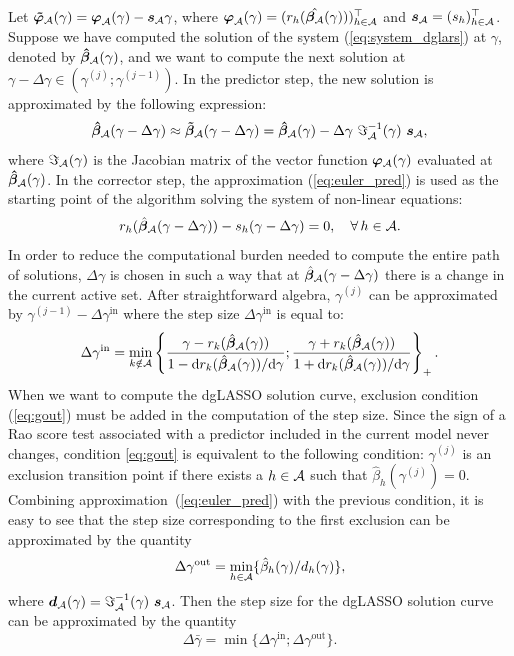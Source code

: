 Let $\boldsymbol{\tilde{\varphi}}_{\mathcal{A}}(\gamma)=\boldsymbol{{\varphi}}_{\mathcal{A}}(\gamma)- \bm{s}_{\mathcal{A}}\gamma$, where $ \boldsymbol{{\varphi}}_{\mathcal{A}}(\gamma) = (r_h(\hat{\bm{\beta}_{\mathcal{A}}}(\gamma)))_{h\in\mathcal{A}}^\top $ and $ \bm{s}_{\mathcal{A}}=(s_h)_{h\in\mathcal{A}}^\top$. Suppose we have computed the solution of the system (\ref{eq:system_dglars}) at $\gamma$, denoted by $\bm{\hat\beta}_{\mathcal{A}}(\gamma)$, and we want to compute the next solution at $\gamma - \Delta\gamma\in(\gamma^{(j)};\gamma^{(j - 1)})$. In the predictor step, the new solution is approximated by the following expression:
%
\begin{equation}\label{eq:euler_pred}
\bm{\hat{\beta}}_{\mathcal{A}}(\gamma - \Delta \gamma) \approx \bm{\tilde{\beta}}_{\mathcal{A}}(\gamma - \Delta \gamma)=\bm{\hat{\beta}}_{\mathcal{A}}(\gamma)- \Delta \gamma \ \Im_{\mathcal{A}}^{-1} (\gamma) \ \bm{s}_{\mathcal{A}},
\end{equation}
%
where $\Im_{\mathcal{A}}(\gamma)$ is the Jacobian matrix of the vector function $\bm{\varphi}_{\mathcal{A}}(\gamma)$ evaluated at  $\bm{\hat{\beta}}_{\mathcal{A}}(\gamma)$. In the corrector step, the approximation (\ref{eq:euler_pred}) is used as the starting point of the algorithm solving the system of non-linear equations:
$$
r_h(\hat{\bm\beta}_{\mathcal{A}}(\gamma-\Delta\gamma)) - s_h (\gamma - \Delta\gamma)  = 0, \quad\forall\,h\in\mathcal{A}.
$$
In order to reduce the computational burden needed to compute the entire path of solutions, $\Delta\gamma$ is chosen in such a way that at $\hat{\bm\beta}_{\mathcal{A}}(\gamma-\Delta\gamma)$ there is a change in the current active set. After straightforward algebra, $\gamma^{(j)}$ can be approximated by $\gamma^{(j - 1)} -\Delta\gamma^{\text{in}}$ where the step size $\Delta\gamma^{\text{in}}$ is equal to:
\begin{equation}\label{eq:delta_in}
\Delta\gamma^{\text{in}} = \min_{k\notin\mathcal{A}} \left\{\frac{\gamma - r_k(\hat{\bm\beta}_{\mathcal{A}}(\gamma))}{1 - \text{d}r_k(\hat{\bm\beta}_{\mathcal{A}}(\gamma))/\text d\gamma}; \frac{\gamma + r_k(\hat{\bm\beta}_{\mathcal{A}}(\gamma))}{1 + \text{d}r_k(\hat{\bm\beta}_{\mathcal{A}}(\gamma))/\text d\gamma}\right\}_+.
\end{equation}
When we want to compute the dgLASSO solution curve, exclusion condition (\ref{eq:gout}) must be added in the computation of the step size. Since the sign of a Rao score test associated with a predictor included in the current model never changes, condition \eqref{eq:gout} is equivalent to the following condition: $\gamma^{(j)}$ is an exclusion transition point if there exists a $h\in\mathcal{A}$ such that
$
\hat\beta_h(\gamma^{(j)}) = 0.
$
Combining approximation~(\ref{eq:euler_pred}) with the previous condition, it is easy to see that the step size corresponding to the first exclusion can be approximated by the quantity
\begin{equation}\label{eq:delta_out}
\Delta\gamma^{\text{out}} = \min_{h\in\mathcal{A}}\{\hat\beta_h(\gamma) / d_h(\gamma)\},
\end{equation}
where $\bm d_{\mathcal{A}}(\gamma) =  \Im_{\mathcal{A}}^{-1} (\gamma) \ \bm{s}_{\mathcal{A}}$. Then the step size for the dgLASSO solution curve can be approximated by the quantity
\begin{equation}\label{eq:delta_in_out}
\Delta\bar{\gamma} = \min\{\Delta\gamma^{\text{in}}; \Delta\gamma^{\text{out}}\}.
\end{equation}

